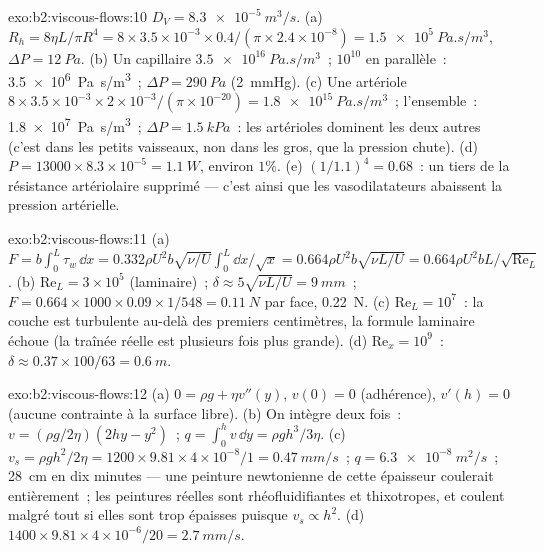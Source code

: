 \begin{solution}{exo:b2:viscous-flows:10}
$D_V = \qty{8.3e-5}{m^3/s}$. (a) $R_h = 8\eta L/\pi R^4 = 8 \times 3.5 \times 10^{-3} \times
0.4/(\pi \times 2.4 \times 10^{-8}) = \qty{1.5e5}{Pa.s/m^3}$, $\Delta P = \qty{12}{Pa}$. (b)
Un capillaire $\qty{3.5e16}{Pa.s/m^3}$~; $10^{10}$ en parallèle~: \qty{3.5e6}{Pa.s/m^3}~;
$\Delta P = \qty{290}{Pa}$ (\qty{2}{mmHg}). (c) Une artériole $8 \times 3.5 \times 10^{-3}
\times 2 \times 10^{-3}/(\pi \times 10^{-20}) = \qty{1.8e15}{Pa.s/m^3}$~; l'ensemble~:
\qty{1.8e7}{Pa.s/m^3}~; $\Delta P = \qty{1.5}{kPa}$~: les artérioles dominent les
deux autres (c'est dans les petits vaisseaux, non dans les gros, que la pression
chute). (d) $P = 13000 \times 8.3 \times 10^{-5} = \qty{1.1}{W}$, environ $1\%$. (e)
$(1/1.1)^4 = 0.68$~: un tiers de la résistance artériolaire supprimé ---
c'est ainsi que les vasodilatateurs abaissent la pression artérielle.
\end{solution}

\begin{solution}{exo:b2:viscous-flows:11}
(a) $F = b\int_0^L\tau_w\,\dd x = 0.332\rho U^2b\sqrt{\nu/U}\int_0^L\dd x/\sqrt x =
0.664\rho U^2b\sqrt{\nu L/U} = 0.664\rho U^2bL/\sqrt{\mathrm{Re}_L}$. (b) $\mathrm{Re}_L =
3 \times 10^5$ (laminaire)~; $\delta \approx 5\sqrt{\nu L/U} = \qty{9}{mm}$~; $F = 0.664 \times 1000
\times 0.09 \times 1/548 = \qty{0.11}{N}$ par face, \qty{0.22}{N}. (c) $\mathrm{Re}_L = 10^7$~:
la couche est turbulente au-delà des premiers centimètres, la formule laminaire
échoue (la traînée réelle est plusieurs fois plus grande). (d) $\mathrm{Re}_x =
10^9$~: $\delta \approx 0.37 \times 100/63 = \qty{0.6}{m}$.
\end{solution}

\begin{solution}{exo:b2:viscous-flows:12}
(a) $0 = \rho g + \eta v''(y)$, $v(0) = 0$ (adhérence), $v'(h) = 0$ (aucune contrainte à
la surface libre). (b) On intègre deux fois~: $v = (\rho g/2\eta)(2hy - y^2)$~; $q =
\int_0^hv\,\dd y = \rho gh^3/3\eta$. (c) $v_s = \rho gh^2/2\eta = 1200 \times 9.81 \times
4 \times 10^{-8}/1 = \qty{0.47}{mm/s}$~; $q = \qty{6.3e-8}{m^2/s}$~; \qty{28}{cm} en dix
minutes --- une peinture newtonienne de cette épaisseur coulerait entièrement~; les
peintures réelles sont rhéofluidifiantes et thixotropes, et coulent malgré tout si elles sont trop épaisses
puisque $v_s \propto h^2$. (d) $1400 \times 9.81 \times 4 \times 10^{-6}/20 = \qty{2.7}{mm/s}$.
\end{solution}

